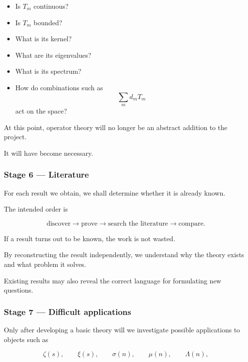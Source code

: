 \begin{itemize}

    \item Is \(T_m\) continuous?

    \item Is \(T_m\) bounded?

    \item What is its kernel?

    \item What are its eigenvalues?

    \item What is its spectrum?

    \item How do combinations such as
    \[
    \sum_m d_mT_m
    \]
    act on the space?

\end{itemize}

At this point, operator theory will no longer be an abstract addition to the
project.

It will have become necessary.

\subsubsection*{Stage 6 --- Literature}

For each result we obtain, we shall determine whether it is already known.

The intended order is

\[
\boxed{
\text{discover}
\longrightarrow
\text{prove}
\longrightarrow
\text{search the literature}
\longrightarrow
\text{compare}.
}
\]

If a result turns out to be known, the work is not wasted.

By reconstructing the result independently, we understand why the theory
exists and what problem it solves.

Existing results may also reveal the correct language for formulating new
questions.

\subsubsection*{Stage 7 --- Difficult applications}

Only after developing a basic theory will we investigate possible
applications to objects such as

\[
\zeta(s),
\qquad
\xi(s),
\qquad
\sigma(n),
\qquad
\mu(n),
\qquad
\Lambda(n),
\]


